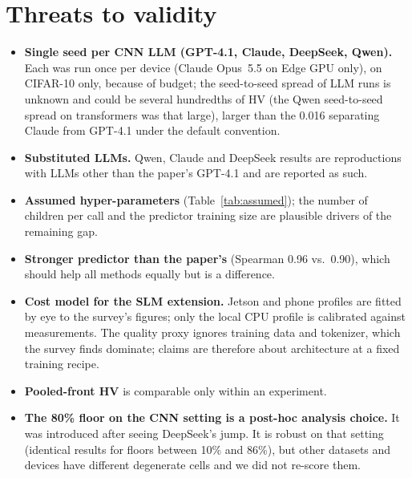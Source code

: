\documentclass[11pt,a4paper]{article}
\begin{document}
\section{Threats to validity}
\begin{itemize}[nosep]
  \item \textbf{Single seed per CNN LLM (GPT-4.1, Claude, DeepSeek, Qwen).} Each was run once per device (Claude Opus~5.5 on Edge GPU only), on CIFAR-10 only, because of budget; the seed-to-seed spread of LLM runs is unknown and could be several hundredths of HV (the Qwen seed-to-seed spread on transformers was that large), larger than the 0.016 separating Claude from GPT-4.1 under the default convention.
  \item \textbf{Substituted LLMs.} Qwen, Claude and DeepSeek results are reproductions with LLMs other than the paper's GPT-4.1 and are reported as such.
  \item \textbf{Assumed hyper-parameters} (Table~\ref{tab:assumed}); the number of children per call and the predictor training size are plausible drivers of the remaining gap.
  \item \textbf{Stronger predictor than the paper's} (Spearman 0.96 vs.\ 0.90), which should help all methods equally but is a difference.
  \item \textbf{Cost model for the SLM extension.} Jetson and phone profiles are fitted by eye to the survey's figures; only the local CPU profile is calibrated against measurements. The quality proxy ignores training data and tokenizer, which the survey finds dominate; claims are therefore about architecture at a fixed training recipe.
  \item \textbf{Pooled-front HV} is comparable only within an experiment.
  \item \textbf{The 80\% floor on the CNN setting is a post-hoc analysis choice.} It was introduced after seeing DeepSeek's jump. It is robust on that setting (identical results for floors between 10\% and 86\%), but other datasets and devices have different degenerate cells and we did not re-score them.
\end{itemize}

\end{document}
